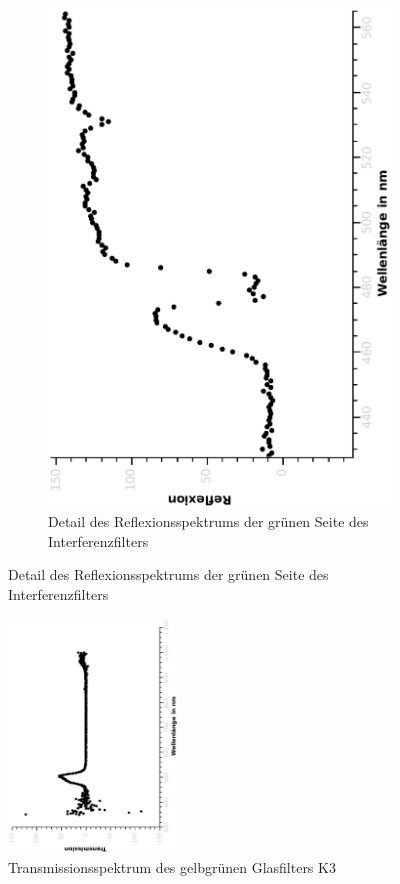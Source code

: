 \documentclass{article}
\begin{document}
\begin{figure}[H]
\begin{subfigure}[h]{0.4\textwidth}
\includegraphics[width=\textwidth ,angle=-90]{eps/interrefldetail.eps}
\caption{Detail des Reflexionsspektrums der grünen Seite des Interferenzfilters}
\end{subfigure}
\end{figure}

\begin{figure}
\centering
\includegraphics[width=0.4\textwidth, angle=-90]{eps/glasfilterk3.eps}
\caption{Transmissionsspektrum \label{fig:glasfilter} des gelbgrünen Glasfilters K3}
\end{figure}
\end{document}
